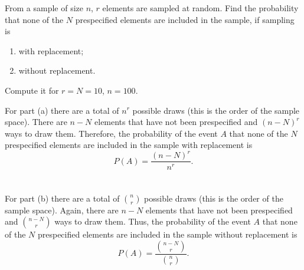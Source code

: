 \begin{problem}[Handout 1, \# 9]
  From a sample of size \(n\), \(r\) elements are sampled at random. Find
  the probability that none of the \(N\) prespecified elements are included
  in the sample, if sampling is
  \begin{enumerate}[label=(\alph*),noitemsep]
  \item with replacement;
  \item without replacement.
  \end{enumerate}
  Compute it for \(r=N=10\), \(n=100\).
\end{problem}
\begin{solution}
  For part (a) there are a total of \(n^r\) possible draws (this is the
  order of the sample space). There are \(n-N\) elements that have not been
  prespecified and \((n-N)^r\) ways to draw them. Therefore, the
  probability of the event \(A\) that none of the \(N\) prespecified
  elements are included in the sample with replacement is
  \[
    P(A)=\frac{(n-N)^r}{n^r}.
  \]
  \\\\
  For part (b) there are a total of \(\binom{n}{r}\) possible draws (this
  is the order of the sample space). Again, there are \(n-N\) elements that
  have not been prespecified and \(\binom{n-N}{r}\) ways to draw
  them. Thus, the probability of the event \(A\) that none of the \(N\)
  prespecified elements are included in the sample without replacement is
  \[
    P(A)=\frac{\binom{n-N}{r}}{\binom{n}{r}}.
  \]
\end{solution}


